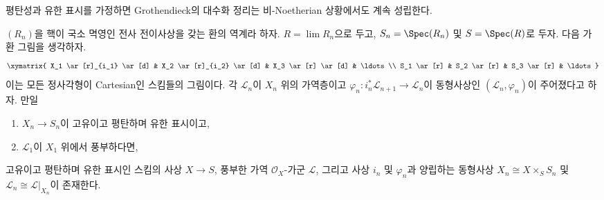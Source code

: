 \begin{lemma}
\label{lemma-polarized-strong-effectiveness}
\begin{slogan}
평탄성과 유한 표시를 가정하면 Grothendieck의 대수화 정리는
비-Noetherian 상황에서도 계속 성립한다.
\end{slogan}
$(R_n)$을 핵이 국소 멱영인 전사 전이사상을 갖는 환의 역계라 하자.
$R = \lim R_n$으로 두고, $S_n = \Spec(R_n)$ 및 $S = \Spec(R)$로 두자.
다음 가환 그림을 생각하자.
$$
\xymatrix{
X_1 \ar[r]_{i_1} \ar[d] & X_2 \ar[r]_{i_2} \ar[d] & X_3 \ar[r] \ar[d] &
\ldots \\
S_1 \ar[r] & S_2 \ar[r] & S_3 \ar[r] & \ldots
}
$$
이는 모든 정사각형이 Cartesian인 스킴들의 그림이다. 각 $\mathcal{L}_n$이
$X_n$ 위의 가역층이고
$\varphi_n : i_n^*\mathcal{L}_{n + 1} \to \mathcal{L}_n$이 동형사상인
$(\mathcal{L}_n, \varphi_n)$이 주어졌다고 하자. 만일
\begin{enumerate}
\item $X_n \to S_n$이 고유이고 평탄하며 유한 표시이고,
\item $\mathcal{L}_1$이 $X_1$ 위에서 풍부하다면,
\end{enumerate}
고유이고 평탄하며 유한 표시인 스킴의 사상 $X \to S$, 풍부한 가역
$\mathcal{O}_X$-가군 $\mathcal{L}$, 그리고 사상 $i_n$ 및 $\varphi_n$과 양립하는
동형사상 $X_n \cong X \times_S S_n$ 및
$\mathcal{L}_n \cong \mathcal{L}|_{X_n}$이 존재한다.
\end{lemma}

